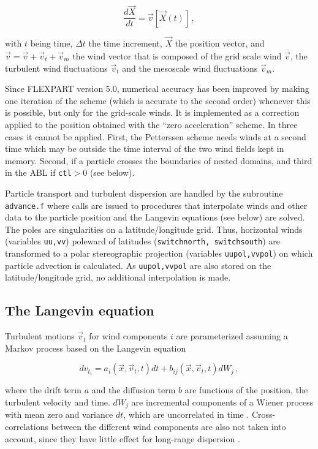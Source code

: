 \documentclass{egu}            %
\begin{document}
\begin{equation}
\frac{d {\vec{X}}}{dt}={\vec{v}}[{\vec{X}}(t)] \,,
\end{equation}

with $t$ being time, $\Delta t$ the time increment, ${\vec{X}}$ the position
vector, and ${\vec{v}}=\overline{\vec{v}}+{\vec{v}}_t+{\vec{v}}_m$ the wind
vector that is composed of the grid scale wind $\overline{\vec{v}}$, the
turbulent wind fluctuations ${\vec{v}}_t$ and the mesoscale wind fluctuations
${\vec{v}}_m$.

Since FLEXPART version 5.0, numerical accuracy has been improved by making one
iteration of the \citet{petterssen1940} scheme (which is accurate to the second
order) whenever this is possible, but only for the grid-scale winds.  It is
implemented as a correction applied to the position obtained with the ``zero
acceleration'' scheme.  In three cases it cannot be applied.  First, the
Petterssen scheme needs winds at a second time which may be outside the time
interval of the two wind fields kept in memory.  Second, if a particle crosses
the boundaries of nested domains, and third in the ABL if \verb|ctl|$>0$ (see
below).

Particle transport and turbulent dispersion are handled by the subroutine
\verb|advance.f| where calls are issued to procedures that interpolate winds
and other data to the particle position and the Langevin equations (see below)
are solved.  The poles are singularities on a latitude/longitude grid.  Thus,
horizontal winds (variables \verb|uu,vv|) poleward of latitudes
(\verb|switchnorth, switchsouth|) are transformed to a polar stereographic
projection (variables \verb|uupol,vvpol|) on which particle advection is
calculated.  As \verb|uupol,vvpol| are also stored on the latitude/longitude
grid, no additional interpolation is made.

\subsection{The Langevin equation}

Turbulent motions ${\vec{v}}_{t}$ for wind components $i$ are parameterized
assuming a Markov process based on the Langevin equation \citep{thomson1987}

\begin{equation}
dv_{t_i}=a_i({\vec{x}},{\vec{v}}_t,t)dt+b_{ij}({\vec{x}},{\vec{v}}_t,t)dW_
j \,,
\label{langevin}
\end{equation}

where the drift term $a$ and the diffusion term $b$ are functions of the
position, the turbulent velocity and time.  $dW_j$ are incremental components
of a Wiener process with mean zero and variance $dt$, which are uncorrelated in
time \citep{legg1982}.  Cross-correlations between the different wind
components are also not taken into account, since they have little effect for
long-range dispersion \citep{uliasz1994}.
\end{document}
